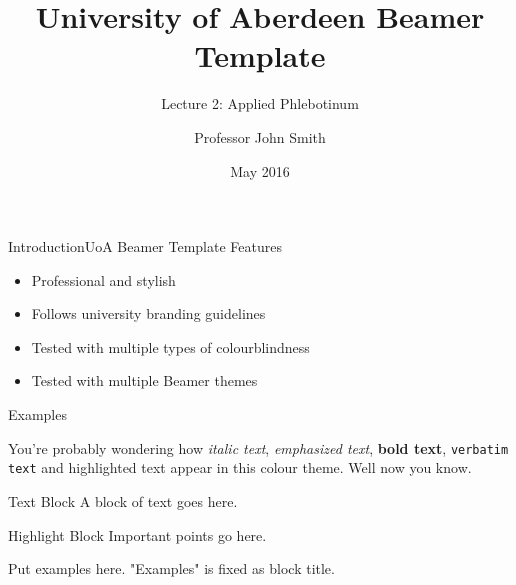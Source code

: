 \documentclass{beamer}
\title{University of Aberdeen Beamer Template}
\subtitle{Lecture 2: Applied Phlebotinum}
\author[Prof J. Smith]{Professor John Smith}
\institute[UoA]{University of Aberdeen}
\date{May 2016}
\begin{document}
\begin{frame}
    \vspace{1.5cm} %
    \titlepage
\end{frame}

\begin{frame}{Introduction}{UoA Beamer Template Features}

\begin{itemize}
    \item Professional and stylish
    \item Follows university branding guidelines
    \item Tested with multiple types of colourblindness
    \item Tested with multiple Beamer themes
\end{itemize}

\end{frame}

\begin{frame}{Examples}

You're probably wondering how \textit{italic text}, \emph{emphasized text}, \textbf{bold text}, \texttt{verbatim text} and \alert{highlighted text} appear in this colour theme. Well now you know.

\begin{block}{Text Block}
A block of text goes here.
\end{block}
 
\begin{alertblock}{Highlight Block}
Important points go here.
\end{alertblock}
 
\begin{examples}
Put examples here. "Examples" is fixed as block title.
\end{examples}

\end{frame}
\end{document}
